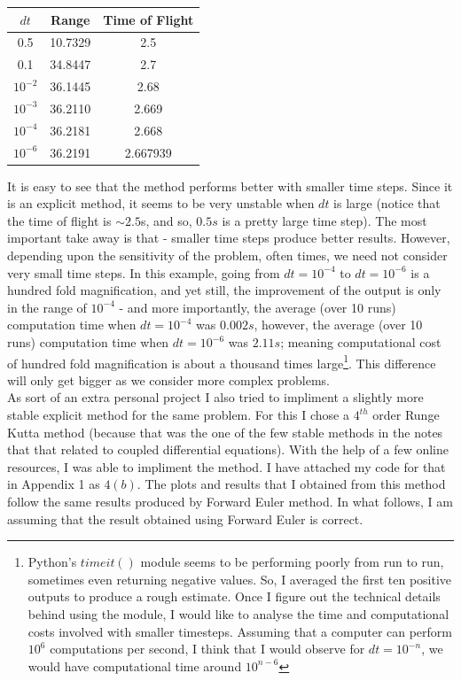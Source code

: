 \documentclass[12pt]{article}
\begin{document}
\begin{center}
	\begin{tabular}{||c c c||} 
		\hline
		$dt$ & Range & Time of Flight \\ [0.5ex] 
		\hline\hline
		0.5 & 10.7329 & 2.5  \\ 
		\hline
		0.1 & 34.8447 & 2.7  \\
		\hline
		$10^{-2}$ & 36.1445 & 2.68  \\
		\hline
		$10^{-3}$ & 36.2110 & 2.669 \\
		\hline
		$10^{-4}$ & 36.2181 & 2.668 \\
		\hline
		$10^{-6}$ & 36.2191 & 2.667939 \\ [0.5ex]
		\hline
	\end{tabular}
\end{center}
It is easy to see that the method performs better with smaller time steps. Since it is an explicit method, it seems to be very unstable when $dt$ is large (notice that the time of flight is $\sim 2.5$s, and so, $0.5s$ is a pretty large time step). The most important take away is that - smaller time steps produce better results. However, depending upon the sensitivity of the problem, often times, we need not consider very small time steps. In this example, going from $dt = 10^{-4}$ to $dt = 10^{-6}$ is a hundred fold magnification, and yet still, the improvement of the output is only in the range of $10^{-4}$ - and more importantly, the average (over 10 runs) computation time when $dt = 10^{-4}$ was $0.002s$, however, the average (over 10 runs) computation time when $dt = 10^{-6}$ was $2.11s$; meaning computational cost of hundred fold magnification is about a thousand times large\footnote{Python's $timeit()$ module seems to be performing poorly from run to run, sometimes even returning negative values. So, I averaged the first ten positive outputs to produce a rough estimate. Once I figure out the technical details behind using the module, I would like to analyse the time and computational costs involved with smaller timesteps. Assuming that a computer can perform $10^6$ computations per second, I think that I would observe for $dt = 10^{-n}$, we would have computational time around $10^{n-6}$}.  This difference will only get bigger as we consider more complex problems. \\
\indent As sort of an extra personal project I also tried to impliment a slightly more stable explicit method for the same problem. For this I chose a $4^{th}$ order Runge Kutta method (because that was the one of the few stable methods in the notes that that related to coupled differential equations). With the help of a few online resources, I was able to impliment the method. I have attached my code for that in Appendix 1 as $4(b)$. The plots and results that I obtained from this method follow the same results produced by Forward Euler method. In what follows, I am assuming that the result obtained using Forward Euler is correct. \\
\end{document}
